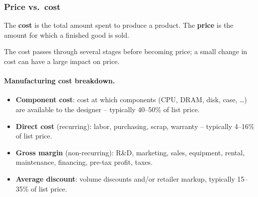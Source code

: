 \subsubsection{Price vs.\ cost}
\begin{definition}
The \textbf{cost} is the total amount spent to produce a product. The
\textbf{price} is the amount for which a finished good is sold.
\end{definition}
The cost passes through several stages before becoming price; a small
change in cost can have a large impact on price.

\paragraph{Manufacturing cost breakdown.}
\begin{itemize}
  \item \textbf{Component cost}: cost at which components (CPU, DRAM, disk,
  case, \dots) are available to the designer -- typically 40--50\% of list
  price.
  \item \textbf{Direct cost} (recurring): labor, purchasing, scrap,
  warranty -- typically 4--16\% of list price.
  \item \textbf{Gross margin} (non-recurring): R\&D, marketing, sales,
  equipment, rental, maintenance, financing, pre-tax profit, taxes.
  \item \textbf{Average discount}: volume discounts and/or retailer markup,
  typically 15--35\% of list price.
\end{itemize}

